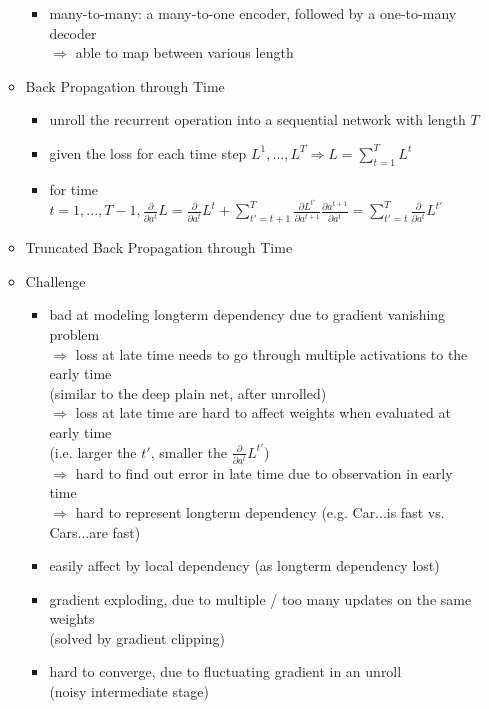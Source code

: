 \begin{itemize}
\begin{itemize}
\begin{itemize}
		\item many-to-many: a many-to-one encoder, followed by a one-to-many decoder \\
		$\Rightarrow$ able to map between various length
		\end{itemize}
	\item Back Propagation through Time
		\begin{itemize}
		\item unroll the recurrent operation into a sequential network with length $T$
		\item given the loss for each time step $L^1,...,L^T \Rightarrow L = \sum_{t=1}^T L^t$
		\item for time $\displaystyle t=1,...,T-1, \frac {\partial} {\partial a^t} L = \frac {\partial} {\partial a^t} L^t + \sum_{t'=t+1}^T\frac {\partial L^{t'}} {\partial a^{t+1}} \frac {\partial a^{t+1}} {\partial a^t} = \sum_{t'=t}^T \frac {\partial} {\partial a^t} L^{t'}$
		\end{itemize}
	\item Truncated Back Propagation through Time
	\item Challenge
		\begin{itemize}
		\item bad at modeling longterm dependency due to gradient vanishing problem \\
		$\Rightarrow$ loss at late time needs to go through multiple activations to the early time \\
		(similar to the deep plain net, after unrolled) \\
		$\Rightarrow$ loss at late time are hard to affect weights when evaluated at early time \\
		(i.e. larger the $t'$, smaller the $\frac {\partial} {\partial a^t} L^{t'}$) \\
		$\Rightarrow$ hard to find out error in late time due to observation in early time \\ 
		$\Rightarrow$ hard to represent longterm dependency 
		(e.g. Car...is fast vs. Cars...are fast)
		\item easily affect by local dependency (as longterm dependency lost)
		\item gradient exploding, due to multiple / too many updates on the same weights \\
		(solved by gradient clipping)
		\item hard to converge, due to fluctuating gradient in an unroll \\ 
		(noisy intermediate stage) \\

\end{itemize}
\end{itemize}
\end{itemize}
